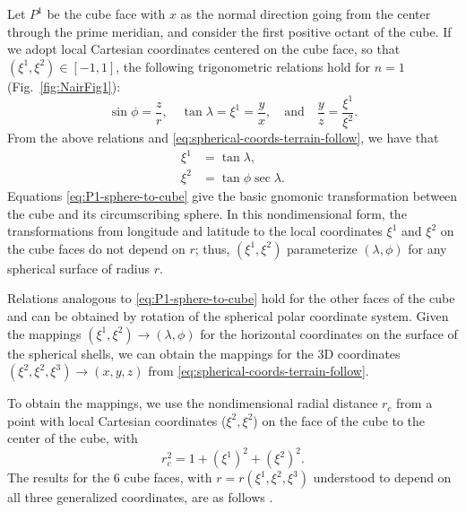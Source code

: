 \documentclass{report}
\begin{document}
Let $P^1$ be the cube face with $x$ as the normal direction going from the center through the prime meridian, and consider the first positive octant of the cube. If we adopt local Cartesian coordinates centered on the cube face, so that $(\xi^1, \xi^2) \in [-1, 1]$, the following trigonometric relations hold for $n=1$ (Fig.~\ref{fig:NairFig1}):
\begin{equation}\label{eq:cube-radial-distance-and-coords}
    \sin \phi = \frac{z}{r}, \quad \tan \lambda = \xi^1 = \frac{y}{x}, \quad \text{and} \quad \frac{y}{z} = \frac{\xi^1}{\xi^2}. 
\end{equation}
From the above relations and \eqref{eq:spherical-coords-terrain-follow}, we have that
\begin{subequations} \label{eq:P1-sphere-to-cube}
    \begin{align}
        \xi^1 &= \tan \lambda,\\
        \xi^2 &= \tan \phi \sec \lambda .
    \end{align}
\end{subequations}
Equations \eqref{eq:P1-sphere-to-cube} give the basic gnomonic transformation between the cube and its circumscribing sphere. In this nondimensional form, the transformations from longitude and latitude to the local coordinates $\xi^1$ and $\xi^2$ on the cube faces do not depend on $r$; thus, $(\xi^1, \xi^2)$ parameterize $(\lambda, \phi)$ for any spherical surface of radius $r$.

Relations analogous to \eqref{eq:P1-sphere-to-cube} hold for the other faces of the cube and can be obtained by rotation of the spherical polar coordinate system. Given the mappings $(\xi^1, \xi^2) \rightarrow (\lambda, \phi)$ for the horizontal coordinates on the surface of the spherical shells, we can obtain the mappings for the 3D coordinates $(\xi^2, \xi^2, \xi^3) \rightarrow (x, y, z)$ from \eqref{eq:spherical-coords-terrain-follow}.

To obtain the mappings, we use the nondimensional radial distance $r_c$ from a point with local Cartesian coordinates ($\xi^2, \xi^2$) on the face of the cube to the center of the cube, with  
\[
r_c^2 = 1 + (\xi^1)^2 + (\xi^2)^2.
\]
The results for the 6 cube faces, with $r=r(\xi^1, \xi^2, \xi^3)$ understood to depend on all three generalized coordinates, are as follows \citep[cf.][]{Nair2005}.
\end{document}
